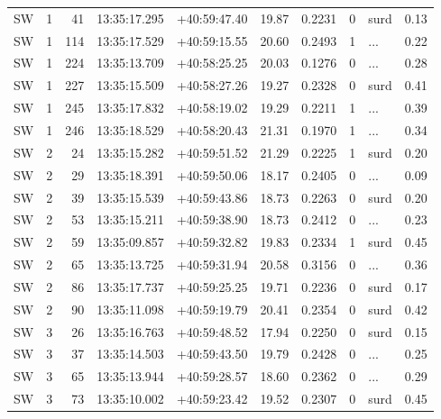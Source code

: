 \begin{tabular}{lrrllrrrlr}
  SW &       1 &     41 &  13:35:17.295 &  +40:59:47.40 &  19.87 &    0.2231 &  0 &       surd &        0.13 \\
  SW &       1 &    114 &  13:35:17.529 &  +40:59:15.55 &  20.60 &    0.2493 &  1 &        ... &        0.22 \\
  SW &       1 &    224 &  13:35:13.709 &  +40:58:25.25 &  20.03 &    0.1276 &  0 &        ... &        0.28 \\
  SW &       1 &    227 &  13:35:15.509 &  +40:58:27.26 &  19.27 &    0.2328 &  0 &       surd &        0.41 \\
  SW &       1 &    245 &  13:35:17.832 &  +40:58:19.02 &  19.29 &    0.2211 &  1 &        ... &        0.39 \\
  SW &       1 &    246 &  13:35:18.529 &  +40:58:20.43 &  21.31 &    0.1970 &  1 &        ... &        0.34 \\
  SW &       2 &     24 &  13:35:15.282 &  +40:59:51.52 &  21.29 &    0.2225 &  1 &       surd &        0.20 \\
  SW &       2 &     29 &  13:35:18.391 &  +40:59:50.06 &  18.17 &    0.2405 &  0 &        ... &        0.09 \\
  SW &       2 &     39 &  13:35:15.539 &  +40:59:43.86 &  18.73 &    0.2263 &  0 &       surd &        0.20 \\
  SW &       2 &     53 &  13:35:15.211 &  +40:59:38.90 &  18.73 &    0.2412 &  0 &        ... &        0.23 \\
  SW &       2 &     59 &  13:35:09.857 &  +40:59:32.82 &  19.83 &    0.2334 &  1 &       surd &        0.45 \\
  SW &       2 &     65 &  13:35:13.725 &  +40:59:31.94 &  20.58 &    0.3156 &  0 &        ... &        0.36 \\
  SW &       2 &     86 &  13:35:17.737 &  +40:59:25.25 &  19.71 &    0.2236 &  0 &       surd &        0.17 \\
  SW &       2 &     90 &  13:35:11.098 &  +40:59:19.79 &  20.41 &    0.2354 &  0 &       surd &        0.42 \\
  SW &       3 &     26 &  13:35:16.763 &  +40:59:48.52 &  17.94 &    0.2250 &  0 &       surd &        0.15 \\
  SW &       3 &     37 &  13:35:14.503 &  +40:59:43.50 &  19.79 &    0.2428 &  0 &        ... &        0.25 \\
  SW &       3 &     65 &  13:35:13.944 &  +40:59:28.57 &  18.60 &    0.2362 &  0 &        ... &        0.29 \\
  SW &       3 &     73 &  13:35:10.002 &  +40:59:23.42 &  19.52 &    0.2307 &  0 &       surd &        0.45 \\
\bottomrule
\end{tabular}
